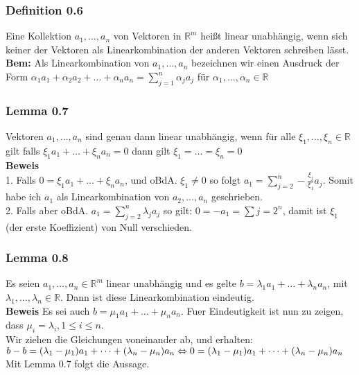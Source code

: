 \documentclass{scrartcl}
\newcommand{\lb}{\lambda}
\newcommand{\R}{\mathbb{R}}
\newcommand{\al}{\alpha}
\begin{document}
\subsubsection{Definition 0.6}
Eine Kollektion \(a_1, \dots, a_n\) von Vektoren in \(\R^m\) hei\ss{}t linear unabh\"angig, wenn sich keiner der Vektoren als Linearkombination der anderen Vektoren schreiben l\"asst.\\
\textbf{Bem:} Als Linearkombination von \(a_1, \dots, a_n\) bezeichnen  wir einen Ausdruck der Form \(\al_1a_1 + \al_2 a_2 + \dots + \al_n a_n = \sum_{j=1}^n \al_j a_j\) f\"ur \(\al_1, \dots, \al_n \in \R\)

\subsubsection{Lemma 0.7}
Vektoren \(a_1, \dots, a_n\) sind genau dann linear unabh\"angig, wenn f\"ur alle \(\xi_1, \dots, \xi_n \in\R\) gilt falls \(\xi_1a_1 + \dots + \xi_na_n = 0\)  dann gilt \(\xi_1 = \dots = \xi_n = 0\)\\
\textbf{Beweis}\\
1. Falls \(0 = \xi_1 a_1 + \dots + \xi_n a_n\), und oBdA. \(\xi_1 \neq 0\) so folgt \(a_1 = \sum_{j=2}^n -\frac{\xi_j}{\xi_1} a_j\). Somit habe ich \(a_1\) als Linearkombination von \(a_2, \dots, a_n\) geschrieben.\\
2. Falls aber oBdA. \(a_1 = \sum_{j=2}^n \lb_j a_j\) so gilt: \(0 = -a_1 = \sum{j=2}^n\), damit ist \(\xi_1\) (der erste Koeffizient) von Null verschieden.

\subsubsection{Lemma 0.8}
Es seien \(a_1, \dots, a_n \in \R^m\)  linear unabh\"angig und es gelte \(b = \lb_1a_1 + \dots + \lb_n a_n\), mit \(\lb_1, \dots, \lb_n \in \R\). Dann ist diese Linearkombination eindeutig.\\
\textbf{Beweis} Es sei auch \(b = \mu_1 a_1 + \dots + \mu_n a_n\). Fuer Eindeutigkeit ist nun zu zeigen, dass \(\mu_i = \lb_i, 1 \le i \le n\).\\
Wir ziehen die Gleichungen voneinander ab, und erhalten:\\
\(
b - b= (\lb_1 - \mu_1) a_1 + \dots + (\lb_n - \mu_n) a_n\\
\Leftrightarrow 0 = (\lb_1 - \mu_1) a_1 + \dots + (\lb_n - \mu_n) a_n\\
\)
Mit Lemma 0.7 folgt die Aussage.
\end{document}
